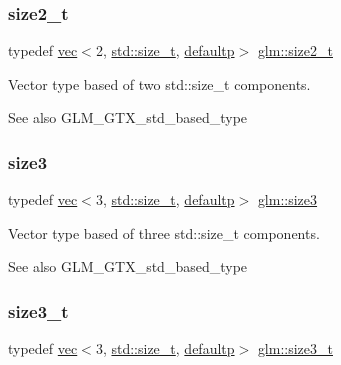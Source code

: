 \subsubsection{\texorpdfstring{size2\+\_\+t}{size2\_t}}
{\footnotesize\ttfamily typedef \hyperlink{structglm_1_1vec}{vec}$<$2, \hyperlink{_s_d_l__config__winrt_8h_a7c94ea6f8948649f8d181ae55911eeaf}{std\+::size\+\_\+t}, \hyperlink{namespaceglm_a36ed105b07c7746804d7fdc7cc90ff25a9d21ccd8b5a009ec7eb7677befc3bf51}{defaultp}$>$ \hyperlink{group__gtx__std__based__type_ga701549a040be1f2f6f661ddecde337de}{glm\+::size2\+\_\+t}}

Vector type based of two std\+::size\+\_\+t components. \begin{DoxySeeAlso}{See also}
G\+L\+M\+\_\+\+G\+T\+X\+\_\+std\+\_\+based\+\_\+type 
\end{DoxySeeAlso}
\mbox{\label{group__gtx__std__based__type_ga2da33d9da32b31af75f036d948b54de5}} 
\subsubsection{\texorpdfstring{size3}{size3}}
{\footnotesize\ttfamily typedef \hyperlink{structglm_1_1vec}{vec}$<$3, \hyperlink{_s_d_l__config__winrt_8h_a7c94ea6f8948649f8d181ae55911eeaf}{std\+::size\+\_\+t}, \hyperlink{namespaceglm_a36ed105b07c7746804d7fdc7cc90ff25a9d21ccd8b5a009ec7eb7677befc3bf51}{defaultp}$>$ \hyperlink{group__gtx__std__based__type_ga2da33d9da32b31af75f036d948b54de5}{glm\+::size3}}

Vector type based of three std\+::size\+\_\+t components. \begin{DoxySeeAlso}{See also}
G\+L\+M\+\_\+\+G\+T\+X\+\_\+std\+\_\+based\+\_\+type 
\end{DoxySeeAlso}
\mbox{\label{group__gtx__std__based__type_gaf0ec088c61853e4ed8155ef66b3760a2}} 
\subsubsection{\texorpdfstring{size3\+\_\+t}{size3\_t}}
{\footnotesize\ttfamily typedef \hyperlink{structglm_1_1vec}{vec}$<$3, \hyperlink{_s_d_l__config__winrt_8h_a7c94ea6f8948649f8d181ae55911eeaf}{std\+::size\+\_\+t}, \hyperlink{namespaceglm_a36ed105b07c7746804d7fdc7cc90ff25a9d21ccd8b5a009ec7eb7677befc3bf51}{defaultp}$>$ \hyperlink{group__gtx__std__based__type_gaf0ec088c61853e4ed8155ef66b3760a2}{glm\+::size3\+\_\+t}}

